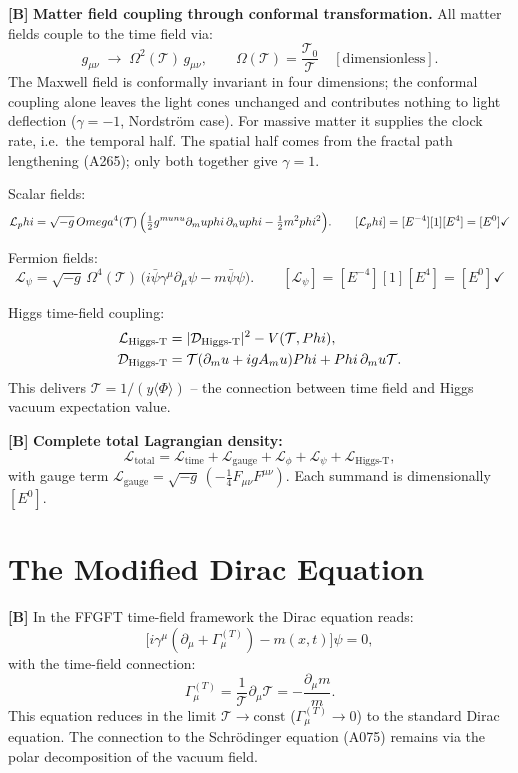 \textbf{[B]} \textbf{Matter field coupling through conformal transformation.} All
matter fields couple to the time field via:
\[
  g_{\mu\nu}\;\to\;\Omega^2(\mathcal T)\,g_{\mu\nu},
  \qquad\Omega(\mathcal T)=\frac{\mathcal T_0}{\mathcal T}\quad[\text{dimensionless}].
\]
The Maxwell field is conformally invariant in four dimensions; the conformal coupling alone leaves the light cones unchanged and contributes nothing to light deflection ($\gamma=-1$, Nordström case). For massive matter it supplies the clock rate, i.e.\ the temporal half. The spatial half comes from the fractal path lengthening (A265); only both together give $\gamma=1$.

Scalar fields:
\[
  \mathcal L_\phi
  = \sqrt{-g}\,\Omega^4(\mathcal T)\,
    \Bigl(\tfrac12 g^{\mu\nu}\partial_\mu\phi\,\partial_\nu\phi
    - \tfrac12 m^2\phi^2\Bigr).
  \qquad [\mathcal L_\phi]=[E^{-4}][1][E^4]=[E^0]\checkmark
\]

Fermion fields:
\[
  \mathcal L_\psi
  = \sqrt{-g}\,\Omega^4(\mathcal T)\,
    \bigl(i\bar\psi\gamma^\mu\partial_\mu\psi - m\bar\psi\psi\bigr).
  \qquad [\mathcal L_\psi]=[E^{-4}][1][E^4]=[E^0]\checkmark
\]

Higgs time-field coupling:
\begin{align}
  \mathcal L_{\text{Higgs-T}}
  &= |\mathcal D_{\text{Higgs-T}}|^2 - V(\mathcal T,\Phi), \notag\\
  \mathcal D_{\text{Higgs-T}}
  &= \mathcal T(\partial_\mu+igA_\mu)\Phi + \Phi\,\partial_\mu\mathcal T. \notag
\end{align}
This delivers $\mathcal T=1/(y\langle\Phi\rangle)$ -- the connection between
time field and Higgs vacuum expectation value.

\textbf{[B]} \textbf{Complete total Lagrangian density:}
\[
  \mathcal L_\text{total}
  = \mathcal L_\text{time}
  + \mathcal L_\text{gauge}
  + \mathcal L_\phi
  + \mathcal L_\psi
  + \mathcal L_{\text{Higgs-T}},
\]
with gauge term $\mathcal L_\text{gauge}=\sqrt{-g}\,(-\tfrac14 F_{\mu\nu}F^{\mu\nu})$.
Each summand is dimensionally $[E^0]$.

\section{The Modified Dirac Equation}

\textbf{[B]} In the FFGFT time-field framework the Dirac equation reads:
\[
  \bigl[i\gamma^\mu(\partial_\mu+\Gamma_\mu^{(T)})-m(x,t)\bigr]\psi=0,
\]
with the time-field connection:
\[
  \Gamma_\mu^{(T)}
  = \frac{1}{\mathcal T}\partial_\mu\mathcal T
  = -\frac{\partial_\mu m}{m}.
\]
This equation reduces in the limit $\mathcal T\to\text{const}$
($\Gamma_\mu^{(T)}\to0$) to the standard Dirac equation. The connection to the
Schrödinger equation (A075) remains via the polar decomposition of the vacuum
field.

